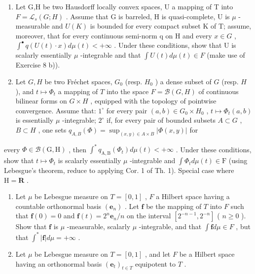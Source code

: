 \begin{enumerate}
\def\labelenumi{\arabic{enumi})}
\setcounter{enumi}{8}
\item
  Let G,H be two Hausdorff locally convex spaces, U a mapping of T into \(F = \mathcal{L}_{s}(G;H)\) . Assume that G is barreled, H is quasi-complete, U is \(\mu\) -measurable and \(U(K)\) is bounded for every compact subset K of T; assume, moreover, that for every continuous semi-norm q on H and every \(x \in G\) , \(\int^{\bullet} q(U(t) \cdot x) d\mu(t) < +\infty\) . Under these conditions, show that U is scalarly essentially \(\mu\) -integrable and that \(\int U(t) d\mu(t) \in F\) (make use of Exercise 8 b)).
\item
  Let \(G, H\) be two Fréchet spaces, \(G_0\) (resp. \(H_0\) ) a dense subset of \(G\) (resp. \(H\) ), and \(t \mapsto \Phi_t\) a mapping of \(T\) into the space \(F = \mathcal{B}(G, H)\) of continuous bilinear forms on \(G \times H\) , equipped with the topology of pointwise convergence. Assume that: \(1^\circ\) for every pair \((a, b) \in G_0 \times H_0\) , \(t \mapsto \Phi_t(a, b)\) is essentially \(\mu\) -integrable; \(2^\circ\) if, for every pair of bounded subsets \(A \subset G\) , \(B \subset H\) , one sets \(q_{A,B}(\Phi) = \sup_{(x, y) \in A \times B} |\Phi(x, y)|\) for
\end{enumerate}

every \(\Phi \in \mathcal{B}(\mathrm{G},\mathrm{H})\) , then \(\int^{*}q_{\mathrm{A},\mathrm{B}}(\Phi_t)d\mu (t) < + \infty\) . Under these conditions, show that \(t\mapsto \Phi_t\) is scalarly essentially \(\mu\) -integrable and \(\int \Phi_t d\mu (t)\in \mathrm{F}\) (using Lebesgue's theorem, reduce to applying Cor. 1 of Th. 1). Special case where \(\mathrm{H} = \mathbf{R}\) .

\begin{enumerate}
\def\labelenumi{\arabic{enumi})}
\setcounter{enumi}{10}
\item
  Let \(\mu\) be Lebesgue measure on \(T = [0,1]\) , \(F\) a Hilbert space having a countable orthonormal basis \((\mathbf{e}_n)\) . Let \(\mathbf{f}\) be the mapping of \(T\) into \(F\) such that \(\mathbf{f}(0) = 0\) and \(\mathbf{f}(t) = 2^n \mathbf{e}_n / n\) on the interval \([2^{-n-1}, 2^{-n}]\) ( \(n \geqslant 0\) ). Show that \(\mathbf{f}\) is \(\mu\) -measurable, scalarly \(\mu\) -integrable, and that \(\int \mathbf{f} d\mu \in F\) , but that \(\int^* |\mathbf{f}| d\mu = +\infty\) .
\item
  Let \(\mu\) be Lebesgue measure on \(T = [0,1]\) , and let \(F\) be a Hilbert space having an orthonormal basis \((\mathbf{e}_t)_{t \in T}\) equipotent to \(T\) .
\end{enumerate}

